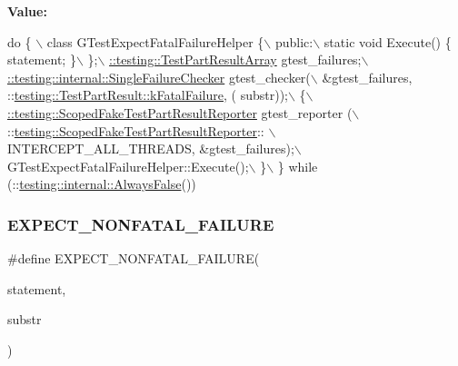 {\bfseries Value\+:}
\begin{DoxyCode}
\textcolor{keywordflow}{do} \{ \(\backslash\)
    class GTestExpectFatalFailureHelper \{\(\backslash\)
     public:\(\backslash\)
      static \textcolor{keywordtype}{void} Execute() \{ statement; \}\(\backslash\)
    \};\(\backslash\)
    \hyperlink{classtesting_1_1_test_part_result_array}{::testing::TestPartResultArray} gtest\_failures;\(\backslash\)
    \hyperlink{classtesting_1_1internal_1_1_single_failure_checker}{::testing::internal::SingleFailureChecker} gtest\_checker(\(\backslash\)
        &gtest\_failures, ::\hyperlink{classtesting_1_1_test_part_result_a65ae656b33fdfdfffaf34858778a52d5ae1bf0b610b697a43fee97628cdab4ea1}{testing::TestPartResult::kFatalFailure}, (
      substr));\(\backslash\)
    \{\(\backslash\)
      \hyperlink{classtesting_1_1_scoped_fake_test_part_result_reporter}{::testing::ScopedFakeTestPartResultReporter} gtest\_reporter
      (\(\backslash\)
          ::\hyperlink{classtesting_1_1_scoped_fake_test_part_result_reporter}{testing::ScopedFakeTestPartResultReporter}:: \(\backslash\)
          INTERCEPT\_ALL\_THREADS, &gtest\_failures);\(\backslash\)
      GTestExpectFatalFailureHelper::Execute();\(\backslash\)
    \}\(\backslash\)
  \} \textcolor{keywordflow}{while} (::\hyperlink{namespacetesting_1_1internal_a4b24c851ab13569b1b15b3d259b60d2e}{testing::internal::AlwaysFalse}())
\end{DoxyCode}
\mbox{\label{gtest-spi_8h_a8376fd6821bd88fd806697355e79e138}} 
\subsubsection{\texorpdfstring{E\+X\+P\+E\+C\+T\+\_\+\+N\+O\+N\+F\+A\+T\+A\+L\+\_\+\+F\+A\+I\+L\+U\+RE}{EXPECT\_NONFATAL\_FAILURE}}
{\footnotesize\ttfamily \#define E\+X\+P\+E\+C\+T\+\_\+\+N\+O\+N\+F\+A\+T\+A\+L\+\_\+\+F\+A\+I\+L\+U\+RE(\begin{DoxyParamCaption}\item[{}]{statement,  }\item[{}]{substr }\end{DoxyParamCaption})}

